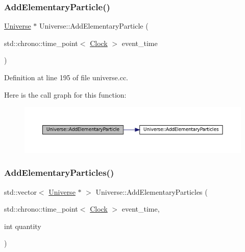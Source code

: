 \subsubsection{\texorpdfstring{Add\+Elementary\+Particle()}{AddElementaryParticle()}}
{\footnotesize\ttfamily \mbox{\hyperlink{class_universe}{Universe}} $\ast$ Universe\+::\+Add\+Elementary\+Particle (\begin{DoxyParamCaption}\item[{std\+::chrono\+::time\+\_\+point$<$ \mbox{\hyperlink{universe_8h_a0ef8d951d1ca5ab3cfaf7ab4c7a6fd80}{Clock}} $>$}]{event\+\_\+time }\end{DoxyParamCaption})}



Definition at line 195 of file universe.\+cc.

Here is the call graph for this function\+:\nopagebreak
\begin{figure}[H]
\begin{center}
\leavevmode
\includegraphics[width=350pt]{class_universe_ab9c84e0576de50aa4fa46655832ce5e4_cgraph}
\end{center}
\end{figure}
\mbox{\label{class_universe_a857cf7f208cd11c80736e82fa523feb5}} 
\subsubsection{\texorpdfstring{Add\+Elementary\+Particles()}{AddElementaryParticles()}}
{\footnotesize\ttfamily std\+::vector$<$ \mbox{\hyperlink{class_universe}{Universe}} $\ast$ $>$ Universe\+::\+Add\+Elementary\+Particles (\begin{DoxyParamCaption}\item[{std\+::chrono\+::time\+\_\+point$<$ \mbox{\hyperlink{universe_8h_a0ef8d951d1ca5ab3cfaf7ab4c7a6fd80}{Clock}} $>$}]{event\+\_\+time,  }\item[{int}]{quantity }\end{DoxyParamCaption})}



